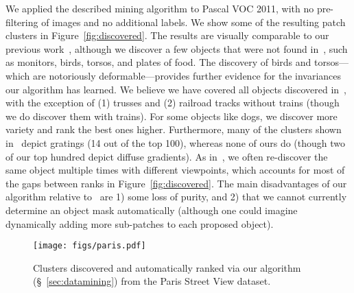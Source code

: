 \documentclass[10pt,twocolumn,letterpaper]{article}
\begin{document}
We applied the described mining algorithm to Pascal VOC 2011, with no pre-filtering of images and no additional labels.
We show some of the resulting patch clusters in Figure~\ref{fig:discovered}.  The results are visually comparable to our previous work~\cite{doersch2014context}, although we discover a few objects that were not found in~\cite{doersch2014context}, such as monitors, birds, torsos, and plates of food.  The discovery of birds and torsos---which are notoriously deformable---provides further evidence for the invariances our algorithm has learned.  
We believe we have covered all objects discovered in~\cite{doersch2014context}, with the exception of (1) trusses and (2) railroad tracks without trains (though we do discover them with trains).  For some objects like dogs, we discover more variety and rank the best ones higher.  Furthermore, many of the clusters shown in~\cite{doersch2014context} depict gratings (14 out of the top 100), whereas none of ours do (though two of our top hundred depict diffuse gradients).  As in~\cite{doersch2014context}, we often re-discover the same object multiple times with different viewpoints, which accounts for most of the gaps between ranks in Figure~\ref{fig:discovered}.  The main disadvantages of our algorithm relative to~\cite{doersch2014context} are 1) some loss of purity, and 2) that we cannot currently determine an object mask automatically (although one could imagine dynamically adding more sub-patches to each proposed object).%

\begin{figure}[t]
\begin{center}

   \texttt{[image: figs/paris.pdf]}
   \vspace{-.2cm}
\end{center}
\vspace{-0.05in}
   \caption{Clusters discovered and automatically ranked via our algorithm (\S~\ref{sec:datamining}) from the Paris Street View dataset. }
   \vspace{-0.1in}
\label{fig:paris}
\end{figure}
\end{document}

